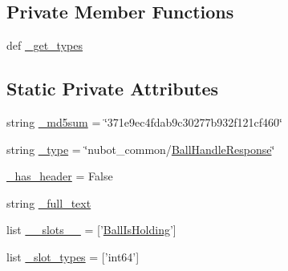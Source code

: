 \subsection*{Private Member Functions}
\begin{DoxyCompactItemize}
\item 
def \hyperlink{classnubot__common_1_1srv_1_1__BallHandle_1_1BallHandleResponse_a115737745f902a52756bbc386f98877a}{\-\_\-get\-\_\-types}
\end{DoxyCompactItemize}
\subsection*{Static Private Attributes}
\begin{DoxyCompactItemize}
\item 
string \hyperlink{classnubot__common_1_1srv_1_1__BallHandle_1_1BallHandleResponse_a08540f98c8b61f3fad80fb636b4ef8a8}{\-\_\-md5sum} = \char`\"{}371e9ec4fdab9c30277b932f121cf460\char`\"{}
\item 
string \hyperlink{classnubot__common_1_1srv_1_1__BallHandle_1_1BallHandleResponse_ac0408460ffb8e29f9d4bf262d668ecd1}{\-\_\-type} = \char`\"{}nubot\-\_\-common/\hyperlink{classnubot__common_1_1srv_1_1__BallHandle_1_1BallHandleResponse}{Ball\-Handle\-Response}\char`\"{}
\item 
\hyperlink{classnubot__common_1_1srv_1_1__BallHandle_1_1BallHandleResponse_a969e6c1fad520b679b8817e8ee1bae62}{\-\_\-has\-\_\-header} = False
\item 
string \hyperlink{classnubot__common_1_1srv_1_1__BallHandle_1_1BallHandleResponse_ae76cc57bba139de71167124fe3789dd6}{\-\_\-full\-\_\-text}
\item 
list \hyperlink{classnubot__common_1_1srv_1_1__BallHandle_1_1BallHandleResponse_af70beade80c0a917ce0f6cbe4bc041a7}{\-\_\-\-\_\-slots\-\_\-\-\_\-} = \mbox{[}'\hyperlink{classnubot__common_1_1srv_1_1__BallHandle_1_1BallHandleResponse_aa45498032f4d3d83a565db954a4a8edc}{Ball\-Is\-Holding}'\mbox{]}
\item 
list \hyperlink{classnubot__common_1_1srv_1_1__BallHandle_1_1BallHandleResponse_a34a2854c72b49b4c51077d18865642e3}{\-\_\-slot\-\_\-types} = \mbox{[}'int64'\mbox{]}
\end{DoxyCompactItemize}


